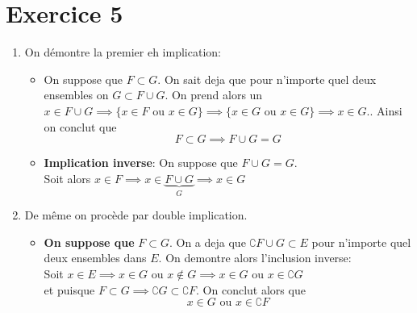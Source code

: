 \documentclass{report}
\begin{document}
\section{Exercice 5}
\begin{myproof}

 \begin{enumerate}
   \item  On démontre la premier eh implication:\\

   \begin{itemize}
     \item On suppose que $F\subset G$. On sait deja que pour n'importe quel
       deux ensembles on $G \subset F\cup G$. On prend alors un $x \in F\cup G
       \implies \{x \in F \text{ ou } x\in G\}\implies
       \{x \in G \text{ ou } x\in G\}\implies 
       x \in G.$.
       Ainsi on conclut que
       $$
       F\subset G \implies F\cup G = G
       $$
     \item \textbf{Implication inverse}: On suppose que $F\cup G = G$.\\

       Soit alors $x \in F\implies x\in \underbrace{F\cup G}_{G} \implies x\in G$
       
   \end{itemize}
   
     \item De même on procède par double implication. 
       \begin{itemize}
         \item \textbf{On suppose que } $F\subset G$.
           On a deja que $\complement F \cup G \subset E$ pour n'importe quel
           deux ensembles dans $E$. On demontre alors l'inclusion inverse:\\

         Soit $x \in E\implies x\in G \text{ ou } x\not\in G\implies x \in G
         \text { ou } x\in \complement G $\\
      et puisque $F\subset G \implies \complement G \subset \complement F$.
      On conclut alors que $$ x \in G \text { ou } x \in \complement F$$


\end{itemize}
\end{enumerate}
\end{myproof}
\end{document}

